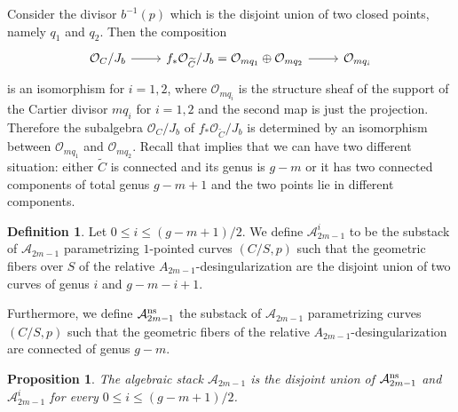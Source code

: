 \documentclass{alggeom}
\numberwithin{equation}{section}
\numberwithin{subsection}{section}
\newtheorem{proposition}[theorem]{Proposition}
\theoremstyle{definition}
\newtheorem{definition}[theorem]{Definition}
\theoremstyle{remark}
\newcommand\cA{\mathcal{A}} \newcommand\cB{\mathcal{B}}
\newcommand\cO{\mathcal{O}} \newcommand\cP{\mathcal{P}}
\begin{document}
Consider the divisor $b^{-1}(p)$ which is the disjoint union of two closed points, namely $q_1$ and $q_2$. Then the composition
$$
\begin{tikzcd}
	\cO_C/J_b \arrow[r] & f_*\cO_{\widetilde{C}}/J_b=\cO_{mq_1}\oplus \cO_{mq_2} \arrow[r] & \cO_{mq_i}
\end{tikzcd}
$$
is an isomorphism for $i=1,2$, where $\cO_{mq_i}$ is the structure sheaf of the support of the Cartier divisor $mq_i$ for $i=1,2$ and the second map is just the projection. Therefore the subalgebra $\cO_C/J_b$ of $f_*\cO_{\widetilde{C}}/J_b$ is determined by an isomorphism between $\cO_{mq_1}$ and $\cO_{mq_2}$. Recall that  implies that we can have two different situation: either $\widetilde{C}$ is connected and its genus is $g-m$  or it has two connected components of total genus $g-m+1$ and the two points lie in different components. 
\begin{definition}
	Let $0\leq i\leq (g-m+1)/2$. We define $\cA_{2m-1}^{i}$ to be the substack of $\cA_{2m-1}$ parametrizing $1$-pointed curves $(C/S,p)$ such that the geometric fibers over $S$ of the relative $A_{2m-1}$-desingularization are the disjoint union of two curves of genus $i$ and $g-m-i+1$.
	
	Furthermore, we define $\cA_{2m-1}^{\rm ns}$ the substack of $\cA_{2m-1}$ parametrizing curves $(C/S,p)$ such that the geometric fibers of the relative $A_{2m-1}$-desingularization are connected of genus $g-m$. 
\end{definition}


\begin{proposition}
	The algebraic stack $\cA_{2m-1}$ is the disjoint union of $\cA_{2m-1}^{\rm ns}$ and $\cA_{2m-1}^i$ for every $0 \leq i\leq  (g-m+1)/2$.
\end{proposition}
\end{document}
